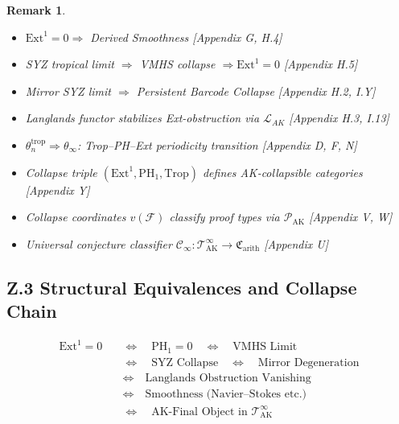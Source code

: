 \documentclass[11pt]{article}
\newtheorem{remark}[theorem]{Remark}
\begin{document}
\begin{remark}
\begin{itemize}
  \item $\mathrm{Ext}^1 = 0 \Rightarrow$ Derived Smoothness  
  \hfill [Appendix G, H.4]

  \item SYZ tropical limit $\Rightarrow$ VMHS collapse $\Rightarrow \mathrm{Ext}^1 = 0$  
  \hfill [Appendix H.5]

  \item Mirror SYZ limit $\Rightarrow$ Persistent Barcode Collapse  
  \hfill [Appendix H.2, I.Y]

  \item Langlands functor stabilizes Ext-obstruction via $\mathcal{L}_{AK}$  
  \hfill [Appendix H.3, I.13]

  \item $\theta^\mathrm{trop}_n \Rightarrow \theta_\infty$: Trop–PH–Ext periodicity transition  
  \hfill [Appendix D, F, N]

  \item Collapse triple $(\mathrm{Ext}^1, \mathrm{PH}_1, \mathrm{Trop})$ defines AK-collapsible categories  
  \hfill [Appendix Y]

  \item Collapse coordinates $v(\mathcal{F})$ classify proof types via $\mathscr{P}_{\mathrm{AK}}$  
  \hfill [Appendix V, W]

  \item Universal conjecture classifier $\mathscr{C}_\infty: \mathscr{T}_{\mathrm{AK}}^\infty \to \mathfrak{C}_{\mathrm{arith}}$  
  \hfill [Appendix U]
\end{itemize}

\vspace{1em}

\subsection*{Z.3 Structural Equivalences and Collapse Chain}
\[
\boxed{
\begin{aligned}
\mathrm{Ext}^1 = 0
&\quad \Leftrightarrow \quad
\mathrm{PH}_1 = 0
\quad \Leftrightarrow \quad
\text{VMHS Limit} \\
&\quad \Leftrightarrow \quad
\text{SYZ Collapse}
\quad \Leftrightarrow \quad
\text{Mirror Degeneration} \\
&\quad \Leftrightarrow \quad
\text{Langlands Obstruction Vanishing} \\
&\quad \Leftrightarrow \quad
\text{Smoothness (Navier–Stokes etc.)} \\
&\quad \Leftrightarrow \quad
\text{AK-Final Object in } \mathscr{T}_{\mathrm{AK}}^\infty
\end{aligned}
}
\]


\end{remark}
\end{document}
